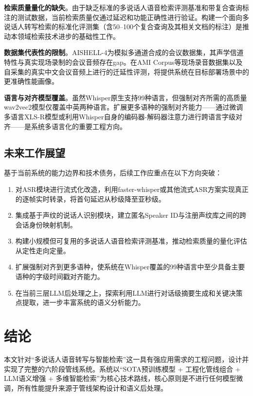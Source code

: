 \documentclass[12pt, a4paper]{article}
\begin{document}
\textbf{检索质量量化的缺失}。由于缺乏标准的多说话人语音检索评测基准和带复合查询标注的测试数据，当前检索质量仅通过延迟和功能正确性进行验证。构建一个面向多说话人转写检索的标准化评测集（含50--100个复合查询及其相关文档的标注）是推动本领域检索技术进步的基础性工作。

\textbf{数据集代表性的限制}。AISHELL-4为模拟多通道合成的会议数据集，其声学信道特性与真实现场录制的会议音频存在gap。在AMI Corpus\cite{carletta2005ami}等现场录音数据集以及自采集的真实中文会议音频上进行的迁延性评测，将提供系统在目标部署场景中的更准确性能画像。

\textbf{语言与对齐模型覆盖}。虽然Whisper原生支持99种语言，但强制对齐所需的高质量wav2vec2模型仅覆盖中英两种语言。扩展更多语种的强制对齐能力——通过微调多语言XLS-R模型\cite{babu2021xlsr}或利用Whisper自身的编码器-解码器注意力进行跨语言字级对齐——是系统多语言化的重要工程方向。

\subsection{未来工作展望}

基于当前系统的能力边界和技术债务，后续工作应重点在以下方向突破：
\begin{enumerate}[label=(\arabic*)]
    \item 对ASR模块进行流式化改造，利用faster-whisper或其他流式ASR方案实现真正的逐帧实时转录，将首句延迟从秒级降至亚秒级。
    \item 集成基于声纹的说话人识别模块，建立匿名Speaker ID与注册声纹库之间的跨会话身份映射机制。
    \item 构建小规模但可复用的多说话人语音检索评测基准，推动检索质量的量化评估从定性走向定量。
    \item 扩展强制对齐到更多语种，使系统在Whisper覆盖的99种语言中至少具备主要语种的字级时间戳对齐能力。
    \item 在当前三层LLM后处理之上，探索利用LLM进行对话级摘要生成和关键决策点提取，进一步丰富系统的语义分析能力。
\end{enumerate}

\section{结论}

本文针对``多说话人语音转写与智能检索''这一具有强应用需求的工程问题，设计并实现了完整的六阶段管线系统。系统以``SOTA预训练模型 + 工程化管线组合 + LLM语义增强 + 多维智能检索''为核心技术路线，核心原则是不进行任何模型微调，所有性能提升来源于管线架构设计和语义后处理。
\end{document}
